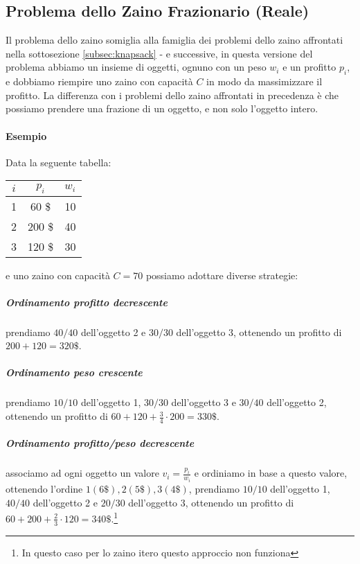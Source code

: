     \subsection{Problema dello Zaino Frazionario (Reale)}
        Il problema dello zaino somiglia alla famiglia dei problemi dello zaino affrontati nella sottosezione \ref{subsec:knapsack} -  e successive, in questa versione del problema abbiamo un insieme di oggetti, ognuno con un peso $w_i$ e un profitto $p_i$, e dobbiamo riempire uno zaino con capacità $C$ in modo da massimizzare il profitto. La differenza con i problemi dello zaino affrontati in precedenza è che possiamo prendere una frazione di un oggetto, e non solo l'oggetto intero. 
        \paragraph{Esempio} Data la seguente tabella:
        \begin{table}[H]
            \centering
            \begin{tabular}{|c|c|c|}
                \hline
                $i$ & $p_i$ & $w_i$\\
                \hline
                1 & 60 \$& 10\\
                2 & 200 \$& 40\\
                3 & 120 \$& 30\\
                \hline
            \end{tabular}
        \end{table}
        e uno zaino con capacità $C=70$ possiamo adottare diverse strategie:
        \subparagraph{Ordinamento profitto decrescente} prendiamo $40/40$ dell'oggetto 2 e $30/30$ dell'oggetto 3, ottenendo un profitto di $200 + 120 = 320\$$.
        \subparagraph{Ordinamento peso crescente} prendiamo $10/10$ dell'oggetto 1, $30/30$ dell'oggetto 3 e $30/40$ dell'oggetto 2, ottenendo un profitto di $60 + 120 + \frac{3}4 \cdot 200 = 330\$$.
        \subparagraph{Ordinamento profitto/peso decrescente} associamo ad ogni oggetto un valore $v_i = \frac{p_i}{w_i}$ e ordiniamo in base a questo valore, ottenendo l'ordine $1 (6\$), 2 (5\$), 3 (4\$)$, prendiamo $10/10$ dell'oggetto 1, $40/40$ dell'oggetto 2 e $20/30$ dell'oggetto 3, ottenendo un profitto di $60 + 200 + \frac{2}3 \cdot 120 = 340\$$.\footnote{In questo caso per lo zaino itero questo approccio non funziona}
